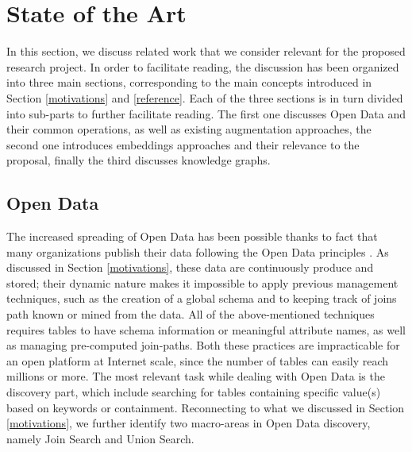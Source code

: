 \section{State of the Art}\label{related}
In this section, we discuss related work that we consider relevant for the proposed research project. In order to facilitate reading, the discussion has been organized into three main sections, corresponding to the main concepts introduced in Section \ref{motivations} and \ref{reference}. Each of the three sections is in turn divided into sub-parts to further facilitate reading. The first one discusses Open Data and their common operations, as well as existing augmentation approaches, the second one introduces embeddings approaches and their relevance to the proposal, finally the third discusses knowledge graphs.

\subsection{Open Data}
The increased spreading of Open Data has been possible thanks to fact that many organizations publish their data following the Open Data principles \cite{bizer2009linked}. As discussed in Section \ref{motivations}, these data are continuously produce and stored; their dynamic nature makes it impossible to apply previous management techniques, such as the creation of a global schema \cite{10.1145/27633.27634} and to keeping track of joins path known or mined from the data\cite{fagin2009clio,deng2017data}. All of the above-mentioned techniques requires tables to have schema information or meaningful attribute names, as well as managing pre-computed join-paths. Both these practices are impracticable for an open platform at Internet scale, since the number of tables can easily reach millions or more. The most relevant task while dealing with Open Data is the discovery part, which include searching for tables containing specific value(s) based on keywords \cite{brickley2019google} or containment. Reconnecting to what we discussed in Section \ref{motivations}, we further identify two macro-areas in Open Data discovery, namely Join Search and Union Search.
\bigbreak

